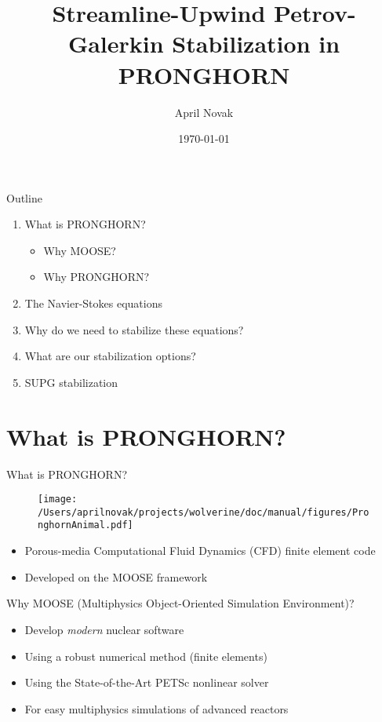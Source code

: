 \documentclass{beamer}
\title[PRONGHORN]{Streamline-Upwind Petrov-Galerkin Stabilization in PRONGHORN}
\author{April Novak}
\institute{UC Berkeley}
\date{\today}
\begin{document}
\begin{frame}
  \titlepage
\end{frame}

\begin{frame}{Outline}
\begin{enumerate}
\item What is PRONGHORN?
	\begin{itemize}
		\item Why MOOSE?
		\item Why PRONGHORN?
	\end{itemize}
\item The Navier-Stokes equations
\item Why do we need to stabilize these equations?
\item What are our stabilization options?
\item SUPG stabilization
\end{enumerate}
\end{frame}

\section{What is PRONGHORN?}

\begin{frame}{What is PRONGHORN?}

\begin{figure}[H]
\centering
\texttt{[image: /Users/aprilnovak/projects/wolverine/doc/manual/figures/PronghornAnimal.pdf]}
\end{figure}

\begin{itemize}
  \item Porous-media Computational Fluid Dynamics (CFD) finite element code
  \item Developed on the MOOSE framework
\end{itemize}

\end{frame}


\begin{frame}{Why MOOSE (Multiphysics Object-Oriented Simulation Environment)?}

\begin{itemize}
  \item Develop \textit{modern} nuclear software
  \item Using a robust numerical method (finite elements)
  \item Using the State-of-the-Art PETSc nonlinear solver
  \item For easy multiphysics simulations of advanced reactors
\end{itemize}

\end{frame}
\end{document}
